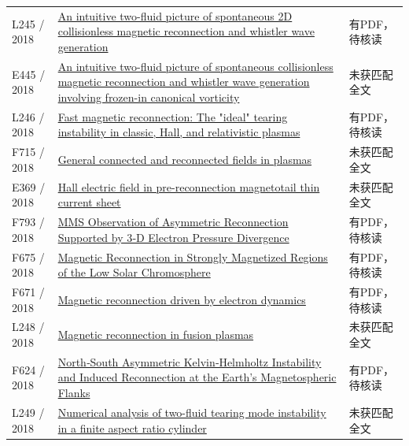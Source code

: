 \documentclass[UTF8,a4paper,11pt,openany,fontset=fandol]{ctexbook}
\begin{document}
\begin{longtable}{P{24mm}P{97mm}P{27mm}}
L245 / 2018 & \href{https://doi.org/10.1063/1.5016345}{An intuitive two-fluid picture of spontaneous 2D collisionless magnetic reconnection and whistler wave generation} & 有PDF，待核读\\

E445 / 2018 & \href{https://ui.adsabs.harvard.edu/abs/2018cosp...42E3772Y/abstract}{An intuitive two-fluid picture of spontaneous collisionless magnetic reconnection and whistler wave generation involving frozen-in canonical vorticity} & 未获匹配全文\\

L246 / 2018 & \href{https://doi.org/10.1088/1742-6596/1031/1/012020}{Fast magnetic reconnection: The "ideal" tearing instability in classic,  Hall,  and relativistic plasmas} & 有PDF，待核读\\

F715 / 2018 & \href{https://doi.org/10.1063/1.5021492}{General connected and reconnected fields in plasmas} & 未获匹配全文\\

E369 / 2018 & \href{https://ui.adsabs.harvard.edu/abs/2018AGUFMSM13B2865L/abstract}{Hall electric field in pre-reconnection magnetotail thin current sheet} & 未获匹配全文\\

F793 / 2018 & \href{https://doi.org/10.1002/2017ja025019}{MMS Observation of Asymmetric Reconnection Supported by 3‐D Electron Pressure Divergence} & 有PDF，待核读\\

F675 / 2018 & \href{https://doi.org/10.3847/1538-4357/aa9edb}{Magnetic Reconnection in Strongly Magnetized Regions of the Low Solar Chromosphere} & 有PDF，待核读\\

F671 / 2018 & \href{https://doi.org/10.1038/s41467-018-07415-3}{Magnetic reconnection driven by electron dynamics} & 有PDF，待核读\\

L248 / 2018 & \href{http://paduaresearch.cab.unipd.it/10907/1/tesi_Luigi_Cordaro.pdf}{Magnetic reconnection in fusion plasmas} & 未获匹配全文\\

F624 / 2018 & \href{https://doi.org/10.1029/2018ja025626}{North‐South Asymmetric Kelvin‐Helmholtz Instability and Induced Reconnection at the Earth's Magnetospheric Flanks} & 有PDF，待核读\\

L249 / 2018 & \href{https://doi.org/10.1063/1.5009389}{Numerical analysis of two-fluid tearing mode instability in a finite aspect ratio cylinder} & 未获匹配全文\\


\end{longtable}
\end{document}
